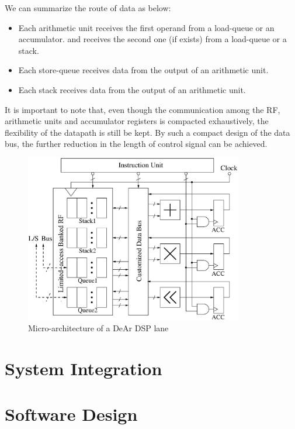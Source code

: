        We can summarize the route of data as below:
        \begin{itemize}
            \item Each arithmetic unit receives the first operand from a load-queue or an accumulator.
        and receives the second one (if exists) from a load-queue or a stack.
            \item Each store-queue receives data from the output of an arithmetic unit.
            \item Each stack receives data from the output of an arithmetic unit.
        \end{itemize}
        It is important to note that, even though the communication among the RF, arithmetic units and accumulator registers is compacted exhaustively, 
        the flexibility of the datapath is still be kept.
        By such a compact design of the data bus, the further reduction in the length of control signal can be achieved.

        \begin{figure}[!ht] 
            \centering
            \includegraphics[width=0.85\textwidth]{./figs/micro.eps}
            \caption{Micro-architecture of a DeAr DSP lane}
            \label{fig:micro}
        \end{figure}


    \section{System Integration}
    \section{Software Design}
            \label{sec:swdesign}
